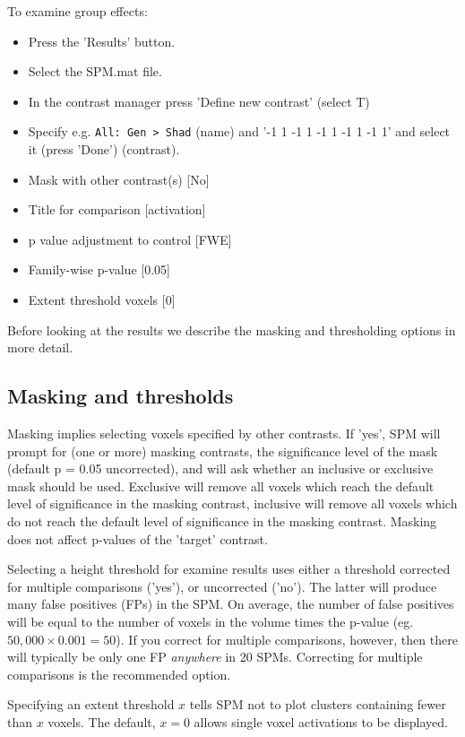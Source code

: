 To examine group effects:
\begin{itemize}
\item{Press the 'Results' button.}
\item{Select the SPM.mat file.}
\item{In the contrast manager press 'Define new contrast' (select T)}
\item{Specify e.g. \verb!All: Gen > Shad! (name) and  '-1 1 -1 1 -1 1 -1 1 -1 1' and select it (press 'Done') (contrast).}
\item{Mask with other contrast(s) [No]}
\item{Title for comparison [activation]}
\item{p value adjustment to control [FWE]}
\item{Family-wise p-value [0.05]}
\item{Extent threshold {voxels} [0]}
\end{itemize}
Before looking at the results we describe the
masking and thresholding options in more detail.

\subsection{Masking and thresholds}

Masking implies selecting voxels specified by other contrasts. If 'yes', SPM will prompt for (one or more) masking contrasts, the significance level of the mask (default p = 0.05 uncorrected), and will ask whether an inclusive or exclusive mask should be used. Exclusive will remove all voxels which reach the default level of significance in the masking contrast, inclusive will remove all voxels which do not reach the default level of significance in the masking contrast. Masking does not affect p-values of the 'target' contrast.

Selecting a height threshold for examine results uses either a threshold corrected for multiple comparisons ('yes'), or uncorrected ('no'). The latter will produce many false positives (FPs) in the SPM. On average, the number of false positives will be equal to the number of voxels in the volume times the
p-value (eg. $50,000 \times 0.001 = 50$). If you correct for multiple comparisons, however, then
there will typically be only one FP {\em anywhere} in 20
SPMs. Correcting for multiple comparisons is the recommended
option.

Specifying an extent threshold $x$ tells SPM not to plot clusters containing fewer than $x$ voxels. The default, $x=0$ allows single voxel activations to be displayed.

